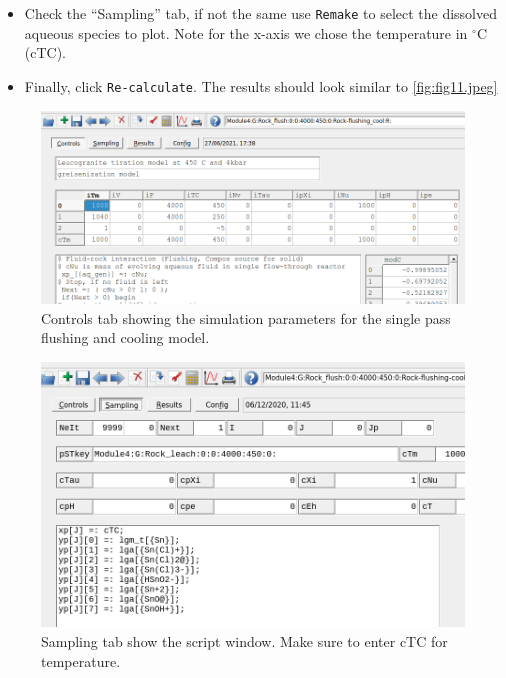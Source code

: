 \documentclass[
]{book}
\begin{document}
\begin{itemize}
\item
  Check the ``Sampling'' tab, if not the same use \texttt{Remake} to select the dissolved aqueous species to plot. Note for the x-axis we chose the temperature in \(^\circ\)C (cTC).
\item
  Finally, click \texttt{Re-calculate}. The results should look similar to \autoref{fig:fig11.jpeg}
\end{itemize}

\begin{figure}
\includegraphics[width=0.9\linewidth]{figures/module4/fig-19} \caption{Controls tab showing the simulation parameters for the single pass flushing and cooling model.}\label{fig:fig-19d}
\end{figure}
\begin{figure}
\includegraphics[width=0.9\linewidth]{figures/module4/fig-20} \caption{Sampling tab show the script window. Make sure to enter cTC for temperature.}\label{fig:fig-20d}
\end{figure}
\end{document}
